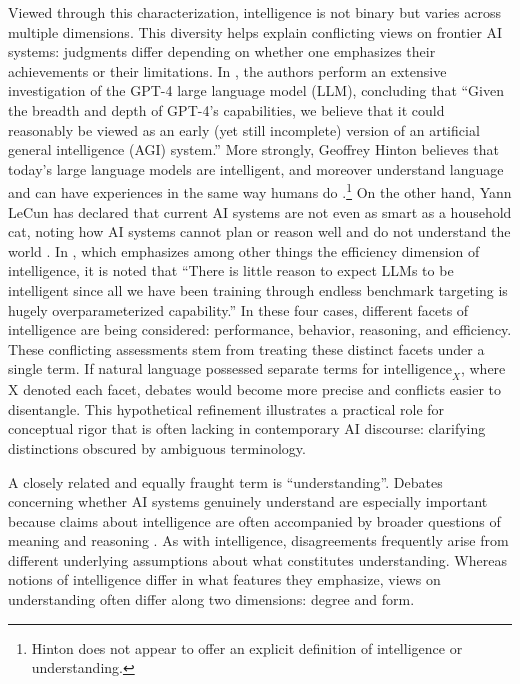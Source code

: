 \documentclass{article}
\begin{document}
Viewed through this characterization, intelligence is not binary but varies across multiple dimensions.
This diversity helps explain conflicting views on frontier AI systems: judgments differ depending on whether one emphasizes their achievements or their limitations.
In \cite{bubeck2023sparksartificialgeneralintelligence}, the authors perform an extensive investigation of the GPT-4 large language model (LLM), concluding that ``Given the breadth and depth of GPT-4’s capabilities, we believe that it could reasonably be viewed as an early (yet still incomplete) version of an artificial general intelligence (AGI) system.''
More strongly, Geoffrey Hinton believes that today’s large language models are intelligent, and moreover understand language and can have experiences in the same way humans do \cite{60MinutesHinton2023, RoyalInstitutionHinton2025}.\footnote{Hinton does not appear to offer an explicit definition of intelligence or understanding.}
On the other hand, Yann LeCun has declared that current AI systems are not even as smart as a household cat, noting how AI systems cannot plan or reason well and do not understand the world \cite{WorldGovernmentsSummitLeCun2024}.
In \cite{krakauer2025largelanguagemodelsemergence}, which emphasizes among other things the efficiency dimension of intelligence, it is noted that ``There is little reason to expect LLMs to be intelligent since all we have been training through endless benchmark targeting is hugely overparameterized capability.''
In these four cases, different facets of intelligence are being considered: performance, behavior, reasoning, and efficiency.
These conflicting assessments stem from treating these distinct facets under a single term.
If natural language possessed separate terms for $\textrm{intelligence}_X$, where X denoted each facet, debates would become more precise and conflicts easier to disentangle.
This hypothetical refinement illustrates a practical role for conceptual rigor that is often lacking in contemporary AI discourse: clarifying distinctions obscured by ambiguous terminology.

A closely related and equally fraught term is ``understanding''.
Debates concerning whether AI systems genuinely understand are especially important because claims about intelligence are often accompanied by broader questions of meaning and reasoning \cite{MitchellKrakauer2023Understanding}.
As with intelligence, disagreements frequently arise from different underlying assumptions about what constitutes understanding.
Whereas notions of intelligence differ in what features they emphasize, views on understanding often differ along two dimensions: degree and form.
\end{document}
